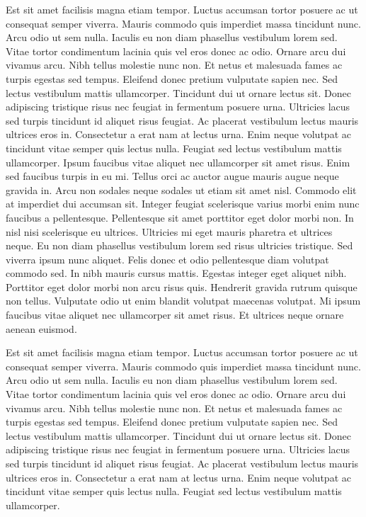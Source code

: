 \documentclass[12pt]{article}
\begin{document}
\par Est sit amet facilisis magna etiam tempor. Luctus accumsan tortor posuere ac ut consequat semper viverra. Mauris commodo quis imperdiet massa tincidunt nunc. Arcu odio ut sem nulla. Iaculis eu non diam phasellus vestibulum lorem sed. Vitae tortor condimentum lacinia quis vel eros donec ac odio. Ornare arcu dui vivamus arcu. Nibh tellus molestie nunc non. Et netus et malesuada fames ac turpis egestas sed tempus. Eleifend donec pretium vulputate sapien nec. Sed lectus vestibulum mattis ullamcorper. Tincidunt dui ut ornare lectus sit. Donec adipiscing tristique risus nec feugiat in fermentum posuere urna. Ultricies lacus sed turpis tincidunt id aliquet risus feugiat. Ac placerat vestibulum lectus mauris ultrices eros in. Consectetur a erat nam at lectus urna. Enim neque volutpat ac tincidunt vitae semper quis lectus nulla. Feugiat sed lectus vestibulum mattis ullamcorper. Ipsum faucibus vitae aliquet nec ullamcorper sit amet risus. Enim sed faucibus turpis in eu mi. Tellus orci ac auctor augue mauris augue neque gravida in. Arcu non sodales neque sodales ut etiam sit amet nisl. Commodo elit at imperdiet dui accumsan sit. Integer feugiat scelerisque varius morbi enim nunc faucibus a pellentesque. Pellentesque sit amet porttitor eget dolor morbi non. In nisl nisi scelerisque eu ultrices. Ultricies mi eget mauris pharetra et ultrices neque. Eu non diam phasellus vestibulum lorem sed risus ultricies tristique. Sed viverra ipsum nunc aliquet. Felis donec et odio pellentesque diam volutpat commodo sed. In nibh mauris cursus mattis. Egestas integer eget aliquet nibh. Porttitor eget dolor morbi non arcu risus quis. Hendrerit gravida rutrum quisque non tellus. Vulputate odio ut enim blandit volutpat maecenas volutpat. Mi ipsum faucibus vitae aliquet nec ullamcorper sit amet risus. Et ultrices neque ornare aenean euismod.

\par Est sit amet facilisis magna etiam tempor. Luctus accumsan tortor posuere ac ut consequat semper viverra. Mauris commodo quis imperdiet massa tincidunt nunc. Arcu odio ut sem nulla. Iaculis eu non diam phasellus vestibulum lorem sed. Vitae tortor condimentum lacinia quis vel eros donec ac odio. Ornare arcu dui vivamus arcu. Nibh tellus molestie nunc non. Et netus et malesuada fames ac turpis egestas sed tempus. Eleifend donec pretium vulputate sapien nec. Sed lectus vestibulum mattis ullamcorper. Tincidunt dui ut ornare lectus sit. Donec adipiscing tristique risus nec feugiat in fermentum posuere urna. Ultricies lacus sed turpis tincidunt id aliquet risus feugiat. Ac placerat vestibulum lectus mauris ultrices eros in. Consectetur a erat nam at lectus urna. Enim neque volutpat ac tincidunt vitae semper quis lectus nulla. Feugiat sed lectus vestibulum mattis ullamcorper.
		
\end{document}
